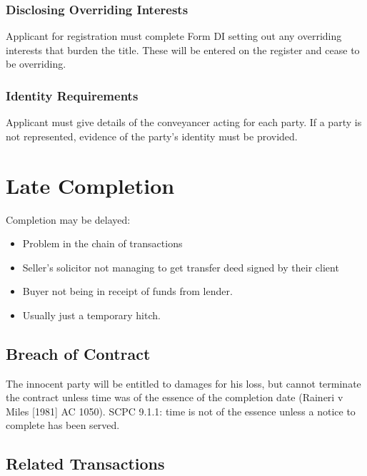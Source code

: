 \documentclass[
]{article}
\providecommand{\tightlist}{%
  \setlength{\itemsep}{0pt}\setlength{\parskip}{0pt}}
\begin{document}
\hypertarget{disclosing-overriding-interests}{%
\subsubsection{Disclosing Overriding
Interests}\label{disclosing-overriding-interests}}

Applicant for registration must complete Form DI setting out any
overriding interests that burden the title. These will be entered on the
register and cease to be overriding.

\hypertarget{identity-requirements}{%
\subsubsection{Identity Requirements}\label{identity-requirements}}

Applicant must give details of the conveyancer acting for each party. If
a party is not represented, evidence of the party's identity must be
provided.

\hypertarget{late-completion}{%
\section{Late Completion}\label{late-completion}}

Completion may be delayed:

\begin{itemize}
\tightlist
\item
  Problem in the chain of transactions
\item
  Seller's solicitor not managing to get transfer deed signed by their
  client
\item
  Buyer not being in receipt of funds from lender.
\item
  Usually just a temporary hitch.
\end{itemize}

\hypertarget{breach-of-contract}{%
\subsection{Breach of Contract}\label{breach-of-contract}}

The innocent party will be entitled to damages for his loss, but cannot
terminate the contract unless time was of the essence of the completion
date (Raineri v Miles {[}1981{]} AC 1050). SCPC 9.1.1: time is not of
the essence unless a notice to complete has been served.

\hypertarget{related-transactions}{%
\subsection{Related Transactions}\label{related-transactions}}
\end{document}

